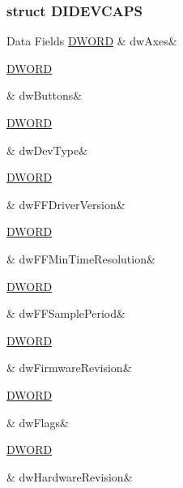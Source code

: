 \subsubsection{struct D\-I\-D\-E\-V\-C\-A\-P\-S}
\begin{DoxyFields}{Data Fields}
\hypertarget{a00003_a24bf72ec9099cceba7f03c9d6c52ae11}{\hyperlink{a00003_a50e15ae51c87ae06ab29c8148cb5f36c}{D\-W\-O\-R\-D}}\label{a00003_a24bf72ec9099cceba7f03c9d6c52ae11}
&
dw\-Axes&
\\
\hline

\hypertarget{a00003_a2e6e5494aa77374c8c88d5ad03e86845}{\hyperlink{a00003_a50e15ae51c87ae06ab29c8148cb5f36c}{D\-W\-O\-R\-D}}\label{a00003_a2e6e5494aa77374c8c88d5ad03e86845}
&
dw\-Buttons&
\\
\hline

\hypertarget{a00003_a2bdaf065880c5cb7fa08be0bf17027a6}{\hyperlink{a00003_a50e15ae51c87ae06ab29c8148cb5f36c}{D\-W\-O\-R\-D}}\label{a00003_a2bdaf065880c5cb7fa08be0bf17027a6}
&
dw\-Dev\-Type&
\\
\hline

\hypertarget{a00003_af19935051869fa809f335c7bcf947c44}{\hyperlink{a00003_a50e15ae51c87ae06ab29c8148cb5f36c}{D\-W\-O\-R\-D}}\label{a00003_af19935051869fa809f335c7bcf947c44}
&
dw\-F\-F\-Driver\-Version&
\\
\hline

\hypertarget{a00003_adabe1d6e9faba066916125dedcc56678}{\hyperlink{a00003_a50e15ae51c87ae06ab29c8148cb5f36c}{D\-W\-O\-R\-D}}\label{a00003_adabe1d6e9faba066916125dedcc56678}
&
dw\-F\-F\-Min\-Time\-Resolution&
\\
\hline

\hypertarget{a00003_a52cdc7a92d7696f1548042a4d6a75f32}{\hyperlink{a00003_a50e15ae51c87ae06ab29c8148cb5f36c}{D\-W\-O\-R\-D}}\label{a00003_a52cdc7a92d7696f1548042a4d6a75f32}
&
dw\-F\-F\-Sample\-Period&
\\
\hline

\hypertarget{a00003_a06384701ec03dd0b73a4162acae81b95}{\hyperlink{a00003_a50e15ae51c87ae06ab29c8148cb5f36c}{D\-W\-O\-R\-D}}\label{a00003_a06384701ec03dd0b73a4162acae81b95}
&
dw\-Firmware\-Revision&
\\
\hline

\hypertarget{a00003_a4d2f405b1141000eb2af256e0fc8b98b}{\hyperlink{a00003_a50e15ae51c87ae06ab29c8148cb5f36c}{D\-W\-O\-R\-D}}\label{a00003_a4d2f405b1141000eb2af256e0fc8b98b}
&
dw\-Flags&
\\
\hline

\hypertarget{a00003_a27d5a9c4a44b526603157e9c4dbf63a4}{\hyperlink{a00003_a50e15ae51c87ae06ab29c8148cb5f36c}{D\-W\-O\-R\-D}}\label{a00003_a27d5a9c4a44b526603157e9c4dbf63a4}
&
dw\-Hardware\-Revision&
\\
\hline


\end{DoxyFields}
